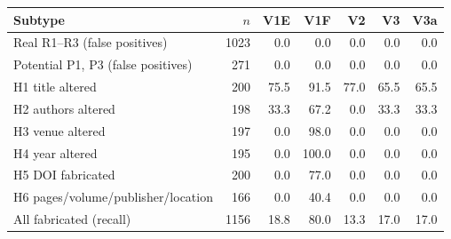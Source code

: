 \begin{tabular}{lrrrrrr}
\toprule
Subtype & $n$ & V1E & V1F & V2 & V3 & V3a \\
\midrule
Real R1--R3 (false positives) & 1023 & 0.0 & 0.0 & 0.0 & 0.0 & 0.0 \\
Potential P1, P3 (false positives) & 271 & 0.0 & 0.0 & 0.0 & 0.0 & 0.0 \\
H1 title altered & 200 & 75.5 & 91.5 & 77.0 & 65.5 & 65.5 \\
H2 authors altered & 198 & 33.3 & 67.2 & 0.0 & 33.3 & 33.3 \\
H3 venue altered & 197 & 0.0 & 98.0 & 0.0 & 0.0 & 0.0 \\
H4 year altered & 195 & 0.0 & 100.0 & 0.0 & 0.0 & 0.0 \\
H5 DOI fabricated & 200 & 0.0 & 77.0 & 0.0 & 0.0 & 0.0 \\
H6 pages/volume/publisher/location & 166 & 0.0 & 40.4 & 0.0 & 0.0 & 0.0 \\
\midrule
All fabricated (recall) & 1156 & 18.8 & 80.0 & 13.3 & 17.0 & 17.0 \\
\bottomrule
\end{tabular}

